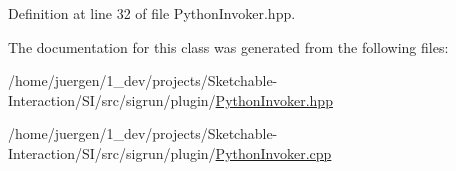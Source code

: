 Definition at line 32 of file Python\+Invoker.\+hpp.



The documentation for this class was generated from the following files\+:\begin{DoxyCompactItemize}
\item 
/home/juergen/1\+\_\+dev/projects/\+Sketchable-\/\+Interaction/\+S\+I/src/sigrun/plugin/\mbox{\hyperlink{_python_invoker_8hpp}{Python\+Invoker.\+hpp}}\item 
/home/juergen/1\+\_\+dev/projects/\+Sketchable-\/\+Interaction/\+S\+I/src/sigrun/plugin/\mbox{\hyperlink{_python_invoker_8cpp}{Python\+Invoker.\+cpp}}\end{DoxyCompactItemize}
